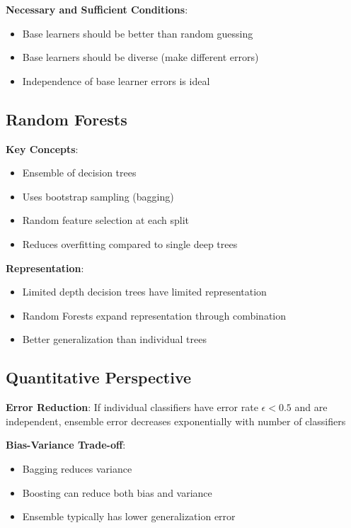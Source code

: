 \documentclass{article}
\begin{document}
\textbf{Necessary and Sufficient Conditions}:
\begin{itemize}
    \item Base learners should be better than random guessing
    \item Base learners should be diverse (make different errors)
    \item Independence of base learner errors is ideal
\end{itemize}

\subsection{Random Forests}

\textbf{Key Concepts}:
\begin{itemize}
    \item Ensemble of decision trees
    \item Uses bootstrap sampling (bagging)
    \item Random feature selection at each split
    \item Reduces overfitting compared to single deep trees
\end{itemize}

\textbf{Representation}:
\begin{itemize}
    \item Limited depth decision trees have limited representation
    \item Random Forests expand representation through combination
    \item Better generalization than individual trees
\end{itemize}

\subsection{Quantitative Perspective}

\textbf{Error Reduction}: If individual classifiers have error rate $\epsilon < 0.5$ and are independent, ensemble error decreases exponentially with number of classifiers

\textbf{Bias-Variance Trade-off}:
\begin{itemize}
    \item Bagging reduces variance
    \item Boosting can reduce both bias and variance
    \item Ensemble typically has lower generalization error
\end{itemize}
\end{document}
